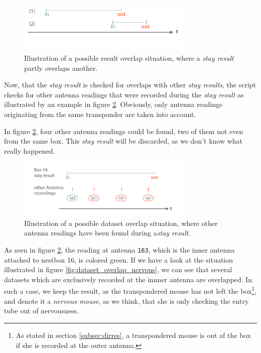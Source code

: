 \begin{figure}[htpb]
\begin{center}
  \includegraphics[width=0.75\textwidth]{assets/pdf/result_overlaps_single_shifted_schema.pdf}
  \caption[Single result partly overlap illustration]{Illustration of a possible result overlap situation, where a \textit{stay result} partly overlaps another.}
  \label{fig:result_overlap_single_shifted}
\end{center}
\end{figure}

Now, that the \textit{stay result} is checked for overlaps with other \textit{stay results}, the script checks for other antenna readings that were recorded during the \textit{stay result} as illustrated by an example in figure \ref{fig:dataset_overlap}. Obviously, only antenna readings originating from the same transponder are taken into account.

In figure \ref{fig:dataset_overlap}, four other antenna readings could be found, two of them not even from the same box. This \textit{stay result} will be discarded, as we don't know what really happened.

\begin{figure}[htpb]
\begin{center}
  \includegraphics[width=0.75\textwidth]{assets/pdf/dataset_overlap_schema.pdf}
  \caption[Dataset overlap illustration]{Illustration of a possible dataset overlap situation, where other antenna readings have been found during a\textit{stay result}.}
  \label{fig:dataset_overlap}
\end{center}
\end{figure}

As seen in figure \ref{fig:dataset_overlap}, the reading at antenna \lstinline|163|, which is the inner antenna attached to nestbox 16, is colored green. If we have a look at the situation illustrated in figure \ref{fig:dataset_overlap_nervous}, we can see that several datasets which are exclusively recorded at the innner antenna are overlapped. In such a case, we keep the result, as the transpondered mouse has not left the box\footnote{As stated in section \ref{subsec:dirres}, a transpondered mouse is out af the box if she is recorded at the outer antenna.}, and denote it a \textit{nervous mouse}, as we think, that she is only checking the entry tube out of nervousness.

